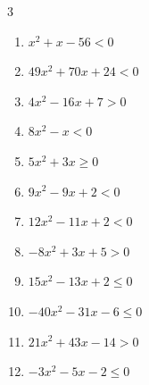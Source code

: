 \begin{multicols}{3}
\begin{enumerate}

  \item $x^{2}+x-56<0$

        \phantom{$\displaystyle -8 < x < 7$}

  \item $49x^{2}+70x+24<0$


  \item $4x^{2}-16x+7>0$


  \item $8x^{2}-x<0$


  \item $5x^{2}+3x\geq 0$


  \item $9x^{2}-9x+2<0$


  \item $12x^{2}-11x+2<0$


  \item $-8x^{2}+3x+5>0$


  \item $15x^{2}-13x+2\leq 0$


\columnbreak %

  \item $-40x^{2}-31x-6\leq 0$


  \item $21x^{2}+43x-14>0$


  \item $-3x^{2}-5x-2\leq 0$


\end{enumerate}
\end{multicols}
